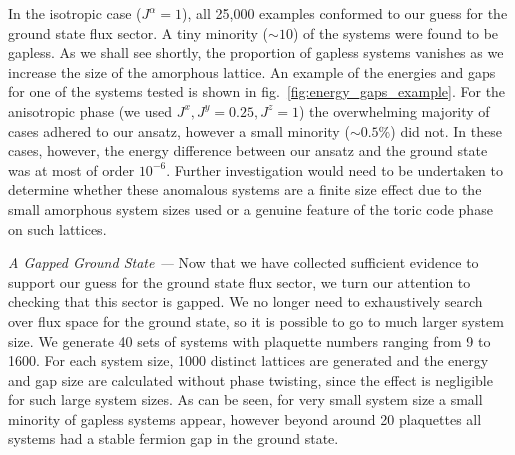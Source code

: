 \documentclass[%
 reprint,
superscriptaddress,
 amsmath,amssymb,
aps,
]{revtex4-2}
\begin{document}
In the isotropic case ($J^\alpha = 1$), all 25,000 examples conformed to our guess for the ground state flux sector. A tiny minority ($\sim 10$) of the systems were found to be gapless. As we shall see shortly, the proportion of gapless systems vanishes as we increase the size of the amorphous lattice. An example of the energies and gaps for one of the systems tested is shown in fig.~\ref{fig:energy_gaps_example}. For the anisotropic phase (we used $ J^x, J^y = 0.25, J^z = 1$) the overwhelming majority of cases adhered to our ansatz, however a small minority ($\sim 0.5 \%$) did not. In these cases, however, the energy difference between our ansatz and the ground state was at most of order $10^{-6}$. Further investigation would need to be undertaken to determine whether these anomalous systems are a finite size effect due to the small amorphous system sizes used or a genuine feature of the toric code phase on such lattices. \par

{\it A Gapped Ground State ---} Now that we have collected sufficient evidence to support our guess for the ground state flux sector, we turn our attention to checking that this sector is gapped. We no longer need to exhaustively search over flux space for the ground state, so it is possible to go to much larger system size. We generate 40 sets of systems with plaquette numbers ranging from 9 to 1600. For each system size, 1000 distinct lattices are generated and the energy and gap size are calculated without phase twisting, since the effect is negligible for such large system sizes. As can be seen, for very small system size a small minority of gapless systems appear, however beyond around 20 plaquettes all systems had a stable fermion gap in the ground state. 


\end{document}
